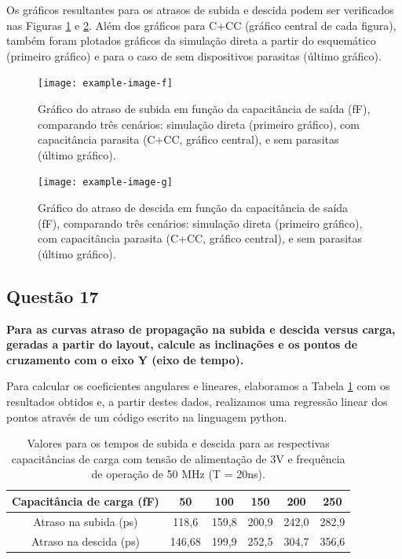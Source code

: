\documentclass[12pt,a4paper]{article}
\begin{document}
Os gráficos resultantes para os atrasos de subida e descida podem ser verificados nas Figuras \ref{fig:delay_subida_cc} e \ref{fig:delay_descida_cc}. Além dos gráficos para C+CC (gráfico central de cada figura), também foram plotados gráficos da simulação direta a partir do esquemático (primeiro gráfico) e para o caso de sem dispositivos parasitas (último gráfico).

\begin{figure}[H]
    \centering
    \texttt{[image: example-image-f]}
    \caption{Gráfico do atraso de subida em função da capacitância de saída (fF), comparando três cenários: simulação direta (primeiro gráfico), com capacitância parasita (C+CC, gráfico central), e sem parasitas (último gráfico).}
    \label{fig:delay_subida_cc}
\end{figure}

\begin{figure}[H]
    \centering
    \texttt{[image: example-image-g]}
    \caption{Gráfico do atraso de descida em função da capacitância de saída (fF), comparando três cenários: simulação direta (primeiro gráfico), com capacitância parasita (C+CC, gráfico central), e sem parasitas (último gráfico).}
    \label{fig:delay_descida_cc}
\end{figure}

\subsection*{Questão 17}

	\textbf{Para as curvas atraso de propagação na subida e descida versus carga, geradas a partir do layout, calcule as inclinações e os pontos de cruzamento com o eixo Y (eixo de tempo).}

Para calcular os coeficientes angulares e lineares, elaboramos a Tabela \ref{tab:delay_values} com os resultados obtidos e, a partir destes dados, realizamos uma regressão linear dos pontos através de um código escrito na linguagem python.

\begin{table}[H]
    \centering
    \caption{Valores para os tempos de subida e descida para as respectivas capacitâncias de carga com tensão de alimentação de 3V e frequência de operação de 50 MHz (T = 20ns).}
    \label{tab:delay_values}
    \begin{tabular}{cccccc}
        \toprule
        Capacitância de carga (fF) & 50 & 100 & 150 & 200 & 250 \\
        \midrule
        Atraso na subida (ps) & 118,6 & 159,8 & 200,9 & 242,0 & 282,9 \\
        Atraso na descida (ps) & 146,68 & 199,9 & 252,5 & 304,7 & 356,6 \\
        \bottomrule
    \end{tabular}
\end{table}
\end{document}
